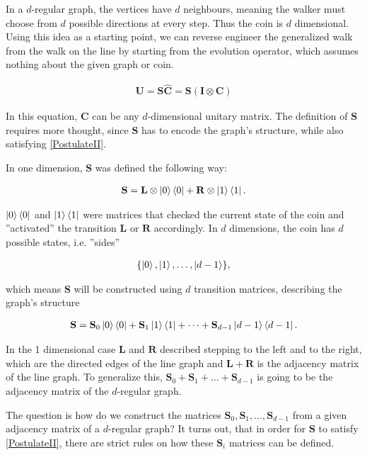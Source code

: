 In a $d$-regular graph, the vertices have $d$ neighbours, meaning the walker must choose from $d$ possible directions at every step. Thus the coin is $d$ dimensional. Using this idea as a starting point, we can reverse engineer the generalized walk from the walk on the line by starting from the evolution operator, which assumes nothing about the given graph or coin.

\begin{align*}
    \mathbf{U} = \mathbf{S} \mathbf{\hat{C}} = \mathbf{S} (\mathbf{I} \otimes \mathbf{C})
\end{align*}

In this equation, $\mathbf{C}$ can be any $d$-dimensional unitary matrix. The definition of $\mathbf{S}$ requires more thought, since $\mathbf{S}$ has to encode the graph's structure, while also satisfying \hyperref[PostulateII]{[PostulateII]}.

In one dimension, $\mathbf{S}$ was defined the following way:

\begin{align*}
\mathbf{S} = \mathbf{L}\otimes\ket{0}\bra{0} + \mathbf{R}\otimes\ket{1}\bra{1}.
\end{align*}

$\ket{0}\bra{0}$ and $\ket{1}\bra{1}$ were matrices that checked the current state of the coin and ''activated'' the transition $\mathbf{L}$ or $\mathbf{R}$ accordingly. In $d$ dimensions, the coin has $d$ possible states, i.e. ''sides''

\begin{align*}
    \{\ket{0}, \ket{1}, \dots, \ket{d-1}\},
\end{align*}

which means $\mathbf{S}$ will be constructed using $d$ transition matrices, describing the graph's structure

\begin{align*}
    \mathbf{S} = \mathbf{S}_0\ket{0}\bra{0} + \mathbf{S}_1\ket{1}\bra{1} + \dots + \mathbf{S}_{d-1}\ket{d-1}\bra{d-1}.
\end{align*}

In the 1 dimensional case $\mathbf{L}$ and $\mathbf{R}$ described stepping to the left and to the right, which are
the directed edges of the line graph and $\mathbf{L} + \mathbf{R}$ is the adjacency matrix of the line graph. To generalize this, $\mathbf{S}_0 + \mathbf{S}_1 + \dots + \mathbf{S}_{d-1}$ is going to be the adjacency matrix of the $d$-regular graph.

The question is how do we construct the matrices $\mathbf{S}_0, \mathbf{S}_1, \dots, \mathbf{S}_{d-1}$ from a given adjacency matrix of a $d$-regular graph? It turns out, that in order for $\mathbf{S}$ to satisfy \hyperref[PostulateII]{[PostulateII]}, there are strict rules on how these $\mathbf{S}_i$ matrices can be defined.

